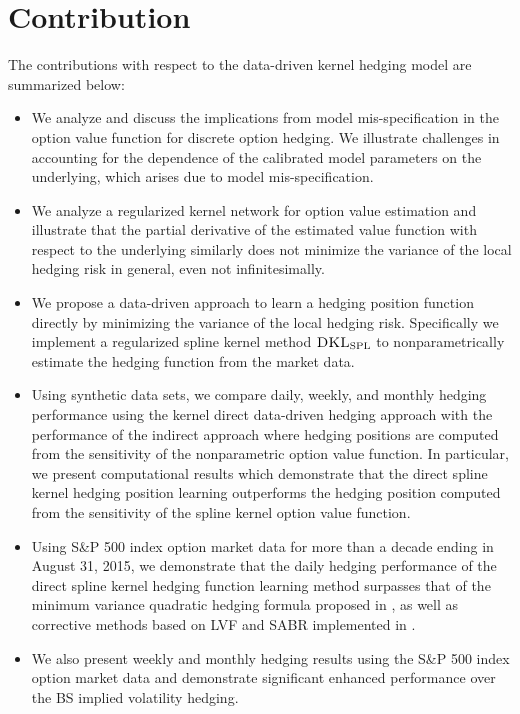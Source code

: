 \documentclass[letterpaper,12pt,titlepage,oneside,final]{book}
\numberwithin{equation}{section}
\theoremstyle{definition}
\newcommand{\DKLs}{\bf\textsc{DKL}_{\text{SPL}}}
\begin{document}
\section{Contribution}
The contributions with respect to the data-driven kernel hedging model \cite{knian2017} are summarized below:
\begin{itemize}
\item We analyze and discuss the implications from model mis-specification in the option value function for discrete option hedging. We illustrate challenges in accounting for the dependence of the calibrated model parameters on the underlying, which arises due to  model mis-specification.

\item We analyze a regularized kernel network for option value estimation and illustrate that  the partial derivative of the estimated value function with respect to the underlying similarly does not minimize the variance of the local hedging risk in general, even not infinitesimally.

\item We propose a data-driven approach to learn a hedging position function directly by minimizing the variance of the local hedging  risk.
    Specifically we implement a regularized spline kernel method $\DKLs$ to nonparametrically estimate the hedging function from the market data.

\item Using synthetic data sets, we compare daily, weekly, and monthly hedging performance using
   the kernel direct data-driven hedging approach with the performance of the indirect approach where hedging positions are computed from the sensitivity of the nonparametric option value function. In particular, we present computational results which demonstrate that the direct spline kernel hedging position learning outperforms the hedging position computed from the sensitivity of the spline kernel option value function.

\item Using  S\&P 500 index option market data for more than a decade ending in August 31, 2015, we demonstrate that the  daily hedging performance of the direct spline kernel hedging function learning method   surpasses that of the   minimum variance quadratic hedging formula proposed in \citep{hulloptimal},  as well as corrective methods based on LVF and SABR implemented in  \citep{hulloptimal}.

\item We also present weekly and monthly hedging results using the  S\&P 500 index option market data and demonstrate significant enhanced performance over the BS implied volatility hedging.
\end{itemize}
\end{document}
